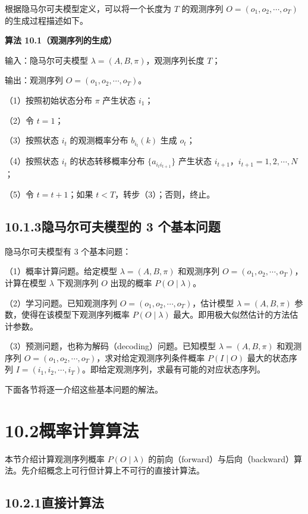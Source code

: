 \documentclass[UTF8, 12pt, fontset=fandol, oneside]{ctexart}
\begin{document}
根据隐马尔可夫模型定义，可以将一个长度为 $T$ 的观测序列 $O=(o_1,o_2,\cdots,o_T)$ 的生成过程描述如下。

\noindent\textbf{算法 10.1（观测序列的生成）}\quad

输入：隐马尔可夫模型 $\lambda=(A,B,\pi)$，观测序列长度 $T$；

输出：观测序列 $O=(o_1,o_2,\cdots,o_T)$。

（1）按照初始状态分布 $\pi$ 产生状态 $i_1$；

（2）令 $t=1$；

（3）按照状态 $i_t$ 的观测概率分布 $b_{i_t}(k)$ 生成 $o_t$；

（4）按照状态 $i_t$ 的状态转移概率分布 $\{a_{i_t i_{t+1}}\}$ 产生状态 $i_{t+1}$，$i_{t+1}=1,2,\cdots,N$；

（5）令 $t=t+1$；如果 $t<T$，转步（3）；否则，终止。

\subsection*{10.1.3\quad 隐马尔可夫模型的 3 个基本问题}

隐马尔可夫模型有 $3$ 个基本问题：

（1）概率计算问题。给定模型 $\lambda=(A,B,\pi)$ 和观测序列 $O=(o_1,o_2,\cdots,o_T)$，计算在模型 $\lambda$ 下观测序列 $O$ 出现的概率 $P(O\mid\lambda)$。

（2）学习问题。已知观测序列 $O=(o_1,o_2,\cdots,o_T)$，估计模型 $\lambda=(A,B,\pi)$ 参数，使得在该模型下观测序列概率 $P(O\mid\lambda)$ 最大。即用极大似然估计的方法估计参数。

（3）预测问题，也称为解码（decoding）问题。已知模型 $\lambda=(A,B,\pi)$ 和观测序列 $O=(o_1,o_2,\cdots,o_T)$，求对给定观测序列条件概率 $P(I\mid O)$ 最大的状态序列 $I=(i_1,i_2,\cdots,i_T)$。即给定观测序列，求最有可能的对应状态序列。

下面各节将逐一介绍这些基本问题的解法。

\section*{10.2\quad 概率计算算法}

本节介绍计算观测序列概率 $P(O\mid\lambda)$ 的前向（forward）与后向（backward）算法。先介绍概念上可行但计算上不可行的直接计算法。

\subsection*{10.2.1\quad 直接计算法}
\end{document}
